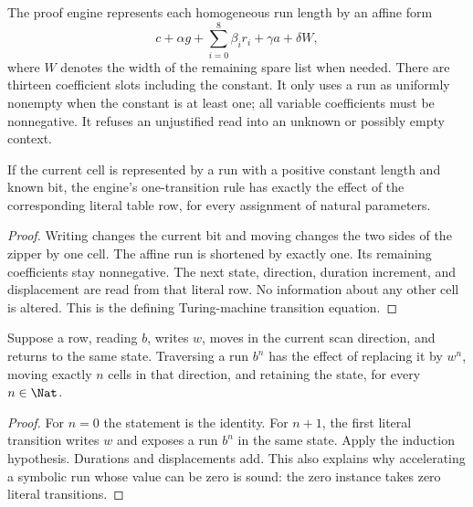 The proof engine represents each homogeneous run length by an affine
form
\[
 c+\alpha g+\sum_{i=0}^{8}\beta_i r_i+\gamma a+\delta W,
\]
where $W$ denotes the width of the remaining spare list when needed.
There are thirteen coefficient slots including the constant. It only
uses a run as uniformly nonempty when the constant is at least one;
all variable coefficients must be nonnegative. It refuses an
unjustified read into an unknown or possibly empty context.

\begin{lemma}
If the current cell is represented by a run with a positive constant
length and known bit, the engine's one-transition rule has exactly
the effect of the corresponding literal table row, for every
assignment of natural parameters.
\end{lemma}
\begin{proof}
Writing changes the current bit and moving changes the two sides of
the zipper by one cell. The affine run is shortened by exactly one.
Its remaining coefficients stay nonnegative. The next state, direction,
duration increment, and displacement are read from that literal row.
No information about any other cell is altered. This is the defining
Turing-machine transition equation.
\end{proof}

\begin{lemma}
Suppose a row, reading $b$, writes $w$, moves in the current scan
direction, and returns to the same state. Traversing a run $b^n$
has the effect of replacing it by $w^n$, moving exactly $n$ cells
in that direction, and retaining the state, for every $n\in\Nat$.
\end{lemma}
\begin{proof}
For $n=0$ the statement is the identity. For $n+1$, the first literal
transition writes $w$ and exposes a run $b^n$ in the same state.
Apply the induction hypothesis. Durations and displacements add.
This also explains why accelerating a symbolic run whose value can
be zero is sound: the zero instance takes zero literal transitions.
\end{proof}

